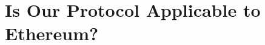 \section{Is Our Protocol Applicable to Ethereum?}
 \label{sec:ethereum}
 
\begin{comment} 
We believe that our protocol could not feasibly be directly applied to Ethereum as it is without a hard fork, but it would be easy to apply it with changes that might feasibly be implemented, 
even with changes not specifically designed with our protocol in mind. Ethereum already uses BLS signatures on the BLS12-381 curve in consensus. To work with BLS12-381, 
our protocol would use KZG commitments on the BW6-767 curve~\cite{bw6767}. Because the base field of BL12-381 is not highly 2-adic, a prover would need a more complicated FFT algorithm 
but this is feasible~\cite{bw6767}. We also need an appropriately sized subgroup of the multiplicative field to use for our Lagrange basis commitments. An easy calculation gives the small prime factors $2,3^2,11,23,47,10177$ and 859267 for the order of the multiplicative group in BLS12-381 and any product of these larger than the number of validators gives a usable subgroup.
 
 Next we consider who constructs the KZG commitment to the validators public keys. For the shortest light client proofs validators would construct and sign this commitment, which would require a change to the consensus logic. As an alternative, a smart contract could compute the commitments on chain.
 This requires the EVM to have access to the active validator's public keys and would also require a precompile for BW6-767 operations to be feasible.
 We note that there have been many suggestions for adding elliptic curve operations for different curves to Ethereum (e.g., EIPs 2537, 2538, 3026~\cite{EIPs}) but few have been implemented so far.
 We would expect this to be the bottleneck for implementing our protocol on Ethereum.
 
 Finally, we compare running our scheme on the full validator set to Ethereum's current light client design~\cite{ethlight}.
 That uses a subset of 1024 public keys that changes every epoch (i.e. 64 blocks or 12.8 minutes). It is not accountable because it would take less than 1024 validators misbehaving to deceive a light client. We remark that 1024 384-bit public keys is comparable in size to 1 bit for all of Ethereum's over 500000 validators, and as a result our light client scheme can be used for an accountable light client with a similar overhead to Ethereum's existing unaccountable scheme.
\end{comment}


